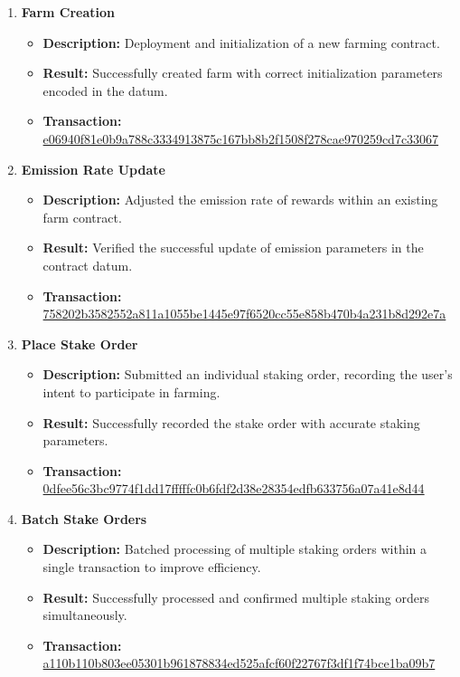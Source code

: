 \documentclass{article}
\begin{document}
\begin{enumerate}
    \item \textbf{Farm Creation}
    \begin{itemize}
        \item \textbf{Description:} Deployment and initialization of a new farming contract.
        \item \textbf{Result:} Successfully created farm with correct initialization parameters encoded in the datum.
        \item \textbf{Transaction:} \href{https://preprod.cexplorer.io/tx/e06940f81e0b9a788c3334913875c167bb8b2f1508f278cae970259cd7c33067}{e06940f81e0b9a788c3334913875c167bb8b2f1508f278cae970259cd7c33067}
    \end{itemize}

    \item \textbf{Emission Rate Update}
    \begin{itemize}
        \item \textbf{Description:} Adjusted the emission rate of rewards within an existing farm contract.
        \item \textbf{Result:} Verified the successful update of emission parameters in the contract datum.
        \item \textbf{Transaction:} \href{https://preprod.cexplorer.io/tx/758202b3582552a811a1055be1445e97f6520cc55e858b470b4a231b8d292e7a}{758202b3582552a811a1055be1445e97f6520cc55e858b470b4a231b8d292e7a}
    \end{itemize}

    \item \textbf{Place Stake Order}
    \begin{itemize}
        \item \textbf{Description:} Submitted an individual staking order, recording the user's intent to participate in farming.
        \item \textbf{Result:} Successfully recorded the stake order with accurate staking parameters.
        \item \textbf{Transaction:} \href{https://preprod.cexplorer.io/tx/0dfee56c3bc9774f1dd17fffffc0b6fdf2d38e28354edfb633756a07a41e8d44}{0dfee56c3bc9774f1dd17fffffc0b6fdf2d38e28354edfb633756a07a41e8d44}
    \end{itemize}

    \item \textbf{Batch Stake Orders}
    \begin{itemize}
        \item \textbf{Description:} Batched processing of multiple staking orders within a single transaction to improve efficiency.
        \item \textbf{Result:} Successfully processed and confirmed multiple staking orders simultaneously.
        \item \textbf{Transaction:} \href{https://preprod.cexplorer.io/tx/a110b110b803ee05301b961878834ed525afcf60f22767f3df1f74bce1ba09b7}{a110b110b803ee05301b961878834ed525afcf60f22767f3df1f74bce1ba09b7}
    \end{itemize}


\end{enumerate}
\end{document}
